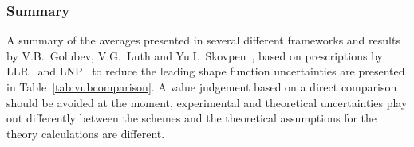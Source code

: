 \subsubsection{Summary}
A summary of the averages presented in several different
frameworks and results by V.B.~Golubev, V.G.~Luth and Yu.I.~Skovpen~\cite{Golubev:2007cs},
based on prescriptions by LLR~\cite{Leibovich:1999xf} and LNP~\cite{Lange:2005qn} 
to reduce the leading shape function uncertainties are presented in 
Table~\ref{tab:vubcomparison}.
A value judgement based on a direct comparison should be
avoided at the moment, experimental and theoretical uncertainties play out
differently between the schemes and the theoretical assumptions for the
theory calculations are different.





